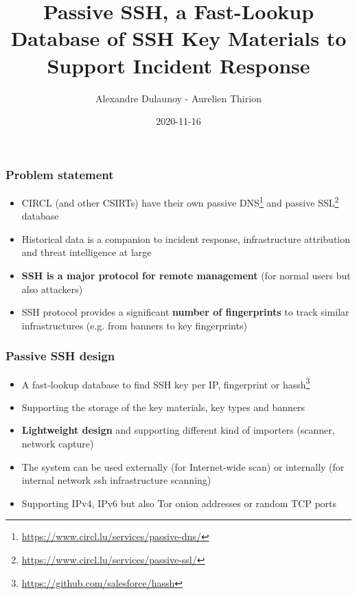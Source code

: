 \documentclass{beamer}
\title{Passive SSH, a Fast-Lookup Database of SSH Key Materials to Support Incident Response}
\subtitle{}
\author{Alexandre Dulaunoy - Aurelien Thirion}
\institute{Team CIRCL \\ \url{https://www.d4-project.org/}}
\date{2020-11-16}
\begin{document}
    \begin{frame}
        \maketitle
    \end{frame}

\begin{frame}
        \frametitle{Problem statement}
        \begin{itemize}
                \item CIRCL (and other CSIRTs) have their own passive DNS\footnote{\url{https://www.circl.lu/services/passive-dns/}} and passive SSL{\footnote{\url{https://www.circl.lu/services/passive-ssl/}}} database
                \item Historical data is a companion to incident response, infrastructure attribution and threat intelligence at large
                \item {\bf SSH is a major protocol for remote management} (for normal users but also attackers)
                \item SSH protocol provides a significant {\bf number of fingerprints} to track similar infrastructures (e.g. from banners to key fingerprints)
        \end{itemize}
\end{frame}

\begin{frame}
        \frametitle{Passive SSH design}
        \begin{itemize}
                \item A fast-lookup database to find SSH key per IP, fingerprint or hassh\footnote{\url{https://github.com/salesforce/hassh}}
                \item Supporting the storage of the key materials, key types and banners
                \item {\bf Lightweight design} and supporting different kind of importers (scanner, network capture)
                \item The system can be used externally (for Internet-wide scan) or internally (for internal network ssh infrastructure scanning)
                \item Supporting IPv4, IPv6 but also Tor onion addresses or random TCP ports
        \end{itemize}
\end{frame}
\end{document}
